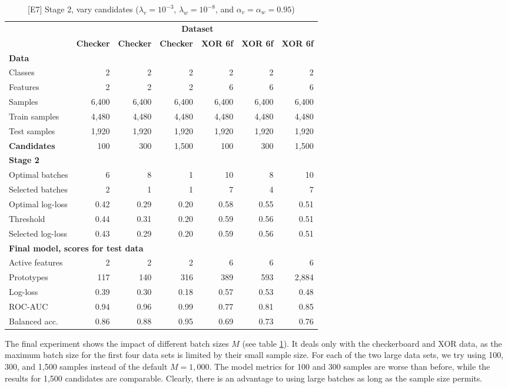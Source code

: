 \begin{table}
\caption{[E7] Stage 2, vary candidates ($\lambda_v=10^{-3}$, $\lambda_w=10^{-8}$, and $\alpha_v=\alpha_w=0.95$)}
\label{tab_e7}
%
\begin{center}
\small
\begin{tabular}{|lrrrrrr|}
\hline
&\multicolumn{6}{c|}{\textbf{\hrulefill\ Dataset \hrulefill}}\\
&\textbf{Checker}&\textbf{Checker}&\textbf{Checker}&\textbf{XOR 6f}&\textbf{XOR 6f}&\textbf{XOR 6f}\\
\multicolumn{7}{|l|}{\textbf{Data}}\\
Classes&2&2&2&2&2&2\\
Features&2&2&2&6&6&6\\
Samples&6,400&6,400&6,400&6,400&6,400&6,400\\
Train samples&4,480&4,480&4,480&4,480&4,480&4,480\\
Test samples&1,920&1,920&1,920&1,920&1,920&1,920\\
\textbf{Candidates}&100&300&1,500&100&300&1,500\\
\multicolumn{7}{|l|}{\textbf{Stage 2}}\\
Optimal batches&6&8&1&10&8&10\\
Selected batches&2&1&1&7&4&7\\
Optimal log-loss&0.42&0.29&0.20&0.58&0.55&0.51\\
Threshold&0.44&0.31&0.20&0.59&0.56&0.51\\
Selected log-loss&0.43&0.29&0.20&0.59&0.56&0.51\\
\multicolumn{7}{|l|}{\textbf{Final model, scores for test data}}\\
Active features&2&2&2&6&6&6\\
Prototypes&117&140&316&389&593&2,884\\
Log-loss&0.39&0.30&0.18&0.57&0.53&0.48\\
ROC-AUC&0.94&0.96&0.99&0.77&0.81&0.85\\
Balanced acc.&0.86&0.88&0.95&0.69&0.73&0.76\\
\hline
\end{tabular}
\end{center}
\end{table}
%
The final experiment shows the impact of different batch sizes $M$ (see table \ref{tab_e7}).
It deals only with the checkerboard and XOR data, as the maximum batch size for the first four data sets is limited by their small sample size.
For each of the two large data sets, we try using 100, 300, and 1,500 samples instead of the default $M=1,000$.
The model metrics for 100 and 300 samples are worse than before, while the results for 1,500 candidates are comparable.
Clearly, there is an advantage to using large batches as long as the sample size permits.
\endinput
